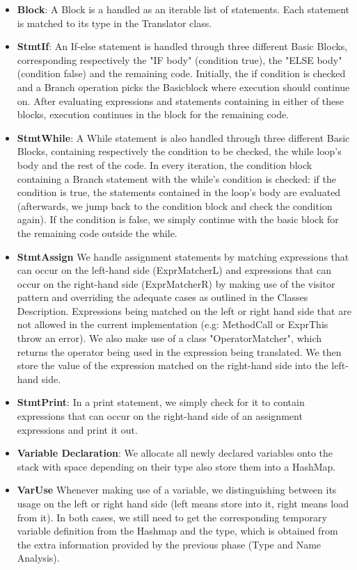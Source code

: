\documentclass[paper=a4, fontsize=11pt]{scrartcl}
\numberwithin{equation}{section}		%
\numberwithin{figure}{section}			%
\numberwithin{table}{section}				%
\begin{document}
\begin{itemize}
	\item \textbf{Block}: A Block is a handled as an iterable list of statements. Each statement is matched to its type in the Translator class.
	\item \textbf{StmtIf}: An If-else statement is handled through three different Basic Blocks, corresponding respectively the "IF body" (condition true), the "ELSE body" (condition false) and the remaining code. Initially, the if condition is checked and a Branch operation picks the Basicblock where execution should continue on. After evaluating expressions and statements containing in either of these blocks, execution continues in the block for the remaining code. 
	\item \textbf{StmtWhile}: A While statement is also handled through three different Basic Blocks, containing respectively the condition to be checked, the while loop's body and the rest of the code. In every iteration,  the condition block containing a Branch statement with the while's condition  is checked: if the condition is true, the statements contained in the loop's body are evaluated (afterwards, we jump back to the condition block and check the condition again). If the condition is false, we simply continue with the basic block for the remaining code outside the while. 
	\item \textbf{StmtAssign} We handle assignment statements by matching expressions that can occur on the left-hand side (ExprMatcherL) and expressions that can occur on the right-hand side (ExprMatcherR) by making use of the visitor pattern and overriding the adequate cases as outlined in the Classes Description. Expressions being matched on the left or right hand side that are not allowed in the current implementation (e.g: MethodCall or ExprThis throw an error). We also make use of a class "OperatorMatcher", which returns the operator being used in the expression being translated. We then store the value of the expression matched on the right-hand side into the left-hand side. 
	\item \textbf{StmtPrint}: In a print statement, we simply check for it to contain expressions that can occur on the right-hand side of an assignment expressions and print it out. 
	\item \textbf{Variable Declaration}: We allocate all newly declared variables onto the stack with space depending on their type also store them into a HashMap.
	\item \textbf{VarUse} Whenever making use of a variable, we distinguishing between its usage on the left or right hand side (left means store into it, right means load from it). In both cases, we still need to get the corresponding temporary variable definition from the Hashmap and the type, which is obtained from the extra information provided by the previous phase (Type and Name Analysis). 

\end{itemize}
\end{document}
